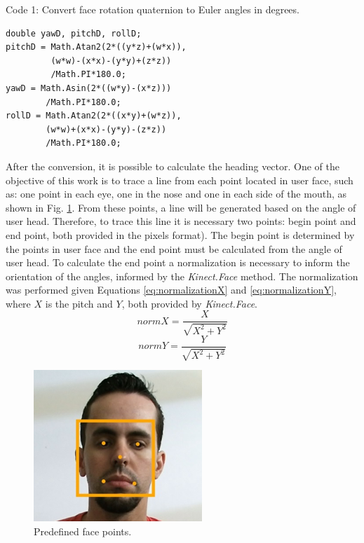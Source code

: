 \documentclass[10pt, conference]{IEEEtran}
\begin{document}
Code 1: Convert face rotation quaternion to Euler angles in degrees.

\begin{lstlisting}
double yawD, pitchD, rollD;
pitchD = Math.Atan2(2*((y*z)+(w*x)),
		 (w*w)-(x*x)-(y*y)+(z*z))
         /Math.PI*180.0;
yawD = Math.Asin(2*((w*y)-(x*z)))
		/Math.PI*180.0;
rollD = Math.Atan2(2*((x*y)+(w*z)),
		(w*w)+(x*x)-(y*y)-(z*z))
        /Math.PI*180.0;
\end{lstlisting}

	After the conversion, it is possible to calculate the heading vector. 
	One of the objective of this work is to trace a line from each point located in user face, such as: one point in each eye, one in the nose and one in each side of the mouth, as shown in Fig. \ref{fig:fig5}. 
	From these points, a line will be generated based on the angle of user head. 
	Therefore, to trace this line it is necessary two points: begin point and end point, both provided in the pixels format). 
	The begin point is determined by the points in user face and the end point must be calculated from the angle of user head. 
	To calculate the end point a normalization is necessary to inform the orientation of the angles, informed by the \emph{Kinect.Face} method. 
	The normalization was performed given Equations \ref{eq:normalizationX} and \ref{eq:normalizationY}, where $X$ is the pitch and $Y$, both provided by \emph{Kinect.Face}.
    \begin{equation}
    	normX = \frac{X}{\sqrt{X^2 + Y^2}}
		\label{eq:normalizationX}
	\end{equation}
    \begin{equation}
    	normY = \frac{Y}{\sqrt{X^2 + Y^2}}    
		\label{eq:normalizationY}
	\end{equation}

    \begin{figure}[t]
        \centering
        \includegraphics{figures/pic5.png}
        \caption{Predefined face points.}
        \label{fig:fig5}
    \end{figure}
\end{document}
